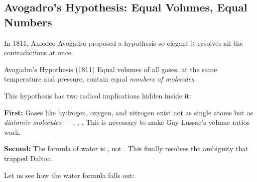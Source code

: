 \documentclass[12pt, a4paper]{book}
\theoremstyle{definition}
\begin{document}
\subsection{Avogadro's Hypothesis: Equal Volumes, Equal Numbers}

In 1811, Amedeo Avogadro proposed a hypothesis so elegant
it resolves all the contradictions at once.

\begin{namedconcept}{Avogadro's Hypothesis (1811)}
Equal volumes of all gases, at the same temperature
and pressure, contain equal \emph{numbers of molecules}.
\end{namedconcept}

\vspace{0.5em}

This hypothesis has two radical implications hidden inside it:

\textbf{First:} Gases like hydrogen, oxygen, and nitrogen
exist not as single atoms but as \emph{diatomic molecules}
--- , , .
This is necessary to make Gay-Lussac's volume ratios work.

\textbf{Second:} The formula of water is , not .
This finally resolves the ambiguity that trapped Dalton.

Let us see how the water formula falls out:
\end{document}
